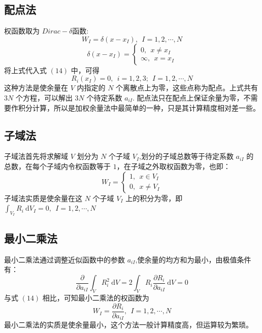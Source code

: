 \documentclass[12pt,a4paper]{article}
\begin{document}
\subsection{配点法}
权函数取为 $Dirac-\delta$函数:
\begin{equation}
W_I=\delta(x-x_I),~~I=1,2,\cdots ,N
\end{equation}
$$
\delta(x-x_I)
=\begin{cases}
0,~~x\ne x_I \\
\infty ,~~x=x_I
\end{cases}
$$
将上式代入式 $(14)$ 中，可得
\begin{equation}
R_i(x_I)=0,~~i=1,2,3;~~I=1,2,\cdots ,N
\end{equation}
这种方法是使余量在 $V$ 内指定的 $N$ 个离散点上为零，这些点称为配点。上式共有 $3N$ 个方程，可以解出 $3N$ 个待定系数 $a_{iI}$.
配点法只在配点上保证余量为零，不需要作积分计算，所以是加权余量法中最简单的一种，只是其计算精度相对差一些。

\subsection{子域法}
子域法首先将求解域 $V$ 划分为 $N$ 个子域 $V_I$,划分的子域总数等于待定系数 $a_{iI}$ 的总数，在每个子域内令权函数等于 $1$，在子域之外取权函数为零，也即：
\begin{equation}
W_I=\begin{cases}
1,~~x\in V_I \\
0,~~x\ne V_I
\end{cases}
\end{equation}
子域法实质是使余量在这 $N$ 个子域 $V_I$ 上的积分为零，即 $\int_{V_I} R_i~ \mathrm{d}V_I=0,~~I=1,2,\cdots ,N$

\subsection{最小二乘法}
最小二乘法通过调整近似函数中的参数 $a_{iI}$,使余量的均方和为最小，由极值条件有：
\begin{equation}
\frac{\partial}{\partial a_{iI}}\int_{V} R^2_i ~ \mathrm{d}V=2\int_{V} R_i\frac{\partial R_i}{\partial a_{iI}} ~ \mathrm{d}V=0
\end{equation}
与式 $(14)$ 相比，可知最小二乘法的权函数为
\begin{equation}
W_I=\frac{\partial R_i}{\partial a_{iI}},~~I=1,2,\cdots ,N
\end{equation}
最小二乘法的实质是使余量最小，这个方法一般计算精度高，但运算较为繁琐。
\end{document}
